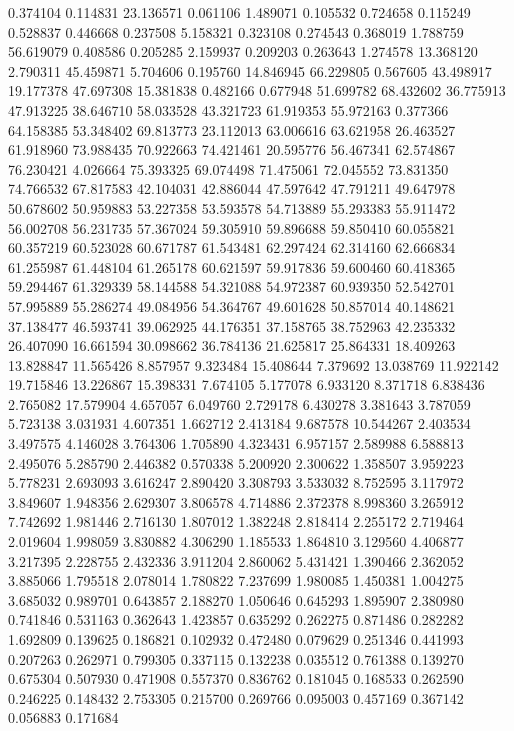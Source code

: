 0.374104
0.114831
23.136571
0.061106
1.489071
0.105532
0.724658
0.115249
0.528837
0.446668
0.237508
5.158321
0.323108
0.274543
0.368019
1.788759
56.619079
0.408586
0.205285
2.159937
0.209203
0.263643
1.274578
13.368120
2.790311
45.459871
5.704606
0.195760
14.846945
66.229805
0.567605
43.498917
19.177378
47.697308
15.381838
0.482166
0.677948
51.699782
68.432602
36.775913
47.913225
38.646710
58.033528
43.321723
61.919353
55.972163
0.377366
64.158385
53.348402
69.813773
23.112013
63.006616
63.621958
26.463527
61.918960
73.988435
70.922663
74.421461
20.595776
56.467341
62.574867
76.230421
4.026664
75.393325
69.074498
71.475061
72.045552
73.831350
74.766532
67.817583
42.104031
42.886044
47.597642
47.791211
49.647978
50.678602
50.959883
53.227358
53.593578
54.713889
55.293383
55.911472
56.002708
56.231735
57.367024
59.305910
59.896688
59.850410
60.055821
60.357219
60.523028
60.671787
61.543481
62.297424
62.314160
62.666834
61.255987
61.448104
61.265178
60.621597
59.917836
59.600460
60.418365
59.294467
61.329339
58.144588
54.321088
54.972387
60.939350
52.542701
57.995889
55.286274
49.084956
54.364767
49.601628
50.857014
40.148621
37.138477
46.593741
39.062925
44.176351
37.158765
38.752963
42.235332
26.407090
16.661594
30.098662
36.784136
21.625817
25.864331
18.409263
13.828847
11.565426
8.857957
9.323484
15.408644
7.379692
13.038769
11.922142
19.715846
13.226867
15.398331
7.674105
5.177078
6.933120
8.371718
6.838436
2.765082
17.579904
4.657057
6.049760
2.729178
6.430278
3.381643
3.787059
5.723138
3.031931
4.607351
1.662712
2.413184
9.687578
10.544267
2.403534
3.497575
4.146028
3.764306
1.705890
4.323431
6.957157
2.589988
6.588813
2.495076
5.285790
2.446382
0.570338
5.200920
2.300622
1.358507
3.959223
5.778231
2.693093
3.616247
2.890420
3.308793
3.533032
8.752595
3.117972
3.849607
1.948356
2.629307
3.806578
4.714886
2.372378
8.998360
3.265912
7.742692
1.981446
2.716130
1.807012
1.382248
2.818414
2.255172
2.719464
2.019604
1.998059
3.830882
4.306290
1.185533
1.864810
3.129560
4.406877
3.217395
2.228755
2.432336
3.911204
2.860062
5.431421
1.390466
2.362052
3.885066
1.795518
2.078014
1.780822
7.237699
1.980085
1.450381
1.004275
3.685032
0.989701
0.643857
2.188270
1.050646
0.645293
1.895907
2.380980
0.741846
0.531163
0.362643
1.423857
0.635292
0.262275
0.871486
0.282282
1.692809
0.139625
0.186821
0.102932
0.472480
0.079629
0.251346
0.441993
0.207263
0.262971
0.799305
0.337115
0.132238
0.035512
0.761388
0.139270
0.675304
0.507930
0.471908
0.557370
0.836762
0.181045
0.168533
0.262590
0.246225
0.148432
2.753305
0.215700
0.269766
0.095003
0.457169
0.367142
0.056883
0.171684
